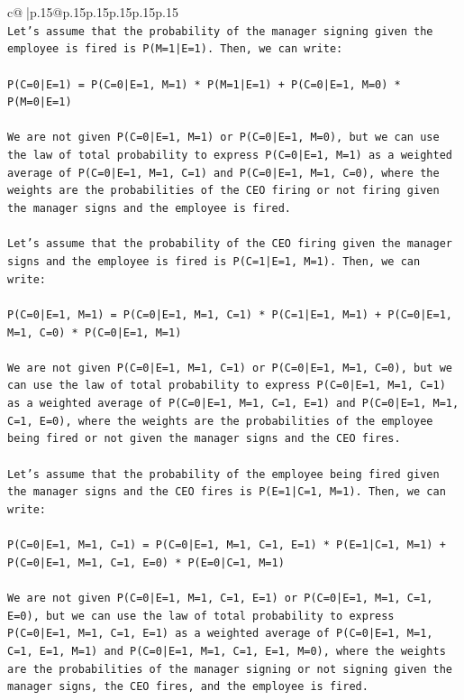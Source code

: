 \documentclass{article}
\begin{document}
{\begin{supertabular}{c@{$\;$}|p{.15\linewidth}@{}p{.15\linewidth}p{.15\linewidth}p{.15\linewidth}p{.15\linewidth}p{.15\linewidth}}
{{{\\ 
\texttt{Let's assume that the probability of the manager signing given the employee is fired is P(M=1|E=1). Then, we can write:} \\
\\ 
\texttt{P(C=0|E=1) = P(C=0|E=1, M=1) * P(M=1|E=1) + P(C=0|E=1, M=0) * P(M=0|E=1)} \\
\\ 
\texttt{We are not given P(C=0|E=1, M=1) or P(C=0|E=1, M=0), but we can use the law of total probability to express P(C=0|E=1, M=1) as a weighted average of P(C=0|E=1, M=1, C=1) and P(C=0|E=1, M=1, C=0), where the weights are the probabilities of the CEO firing or not firing given the manager signs and the employee is fired.} \\
\\ 
\texttt{Let's assume that the probability of the CEO firing given the manager signs and the employee is fired is P(C=1|E=1, M=1). Then, we can write:} \\
\\ 
\texttt{P(C=0|E=1, M=1) = P(C=0|E=1, M=1, C=1) * P(C=1|E=1, M=1) + P(C=0|E=1, M=1, C=0) * P(C=0|E=1, M=1)} \\
\\ 
\texttt{We are not given P(C=0|E=1, M=1, C=1) or P(C=0|E=1, M=1, C=0), but we can use the law of total probability to express P(C=0|E=1, M=1, C=1) as a weighted average of P(C=0|E=1, M=1, C=1, E=1) and P(C=0|E=1, M=1, C=1, E=0), where the weights are the probabilities of the employee being fired or not given the manager signs and the CEO fires.} \\
\\ 
\texttt{Let's assume that the probability of the employee being fired given the manager signs and the CEO fires is P(E=1|C=1, M=1). Then, we can write:} \\
\\ 
\texttt{P(C=0|E=1, M=1, C=1) = P(C=0|E=1, M=1, C=1, E=1) * P(E=1|C=1, M=1) + P(C=0|E=1, M=1, C=1, E=0) * P(E=0|C=1, M=1)} \\
\\ 
\texttt{We are not given P(C=0|E=1, M=1, C=1, E=1) or P(C=0|E=1, M=1, C=1, E=0), but we can use the law of total probability to express P(C=0|E=1, M=1, C=1, E=1) as a weighted average of P(C=0|E=1, M=1, C=1, E=1, M=1) and P(C=0|E=1, M=1, C=1, E=1, M=0), where the weights are the probabilities of the manager signing or not signing given the manager signs, the CEO fires, and the employee is fired.} \\
}}}
\end{supertabular}}
\end{document}
